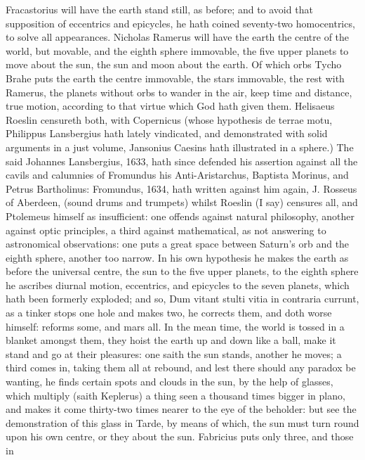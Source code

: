 {Fracastorius will have the earth stand still, as before; and to avoid
that supposition of eccentrics and epicycles, he hath coined
seventy-two homocentrics, to solve all appearances. Nicholas Ramerus
will have the earth the centre of the world, but movable, and the
eighth sphere immovable, the five upper planets to move about the sun,
the sun and moon about the earth. Of which orbs Tycho Brahe puts the
earth the centre immovable, the stars immovable, the rest with Ramerus,
the planets without orbs to wander in the air, keep time and distance,
true motion, according to that virtue which God hath given them.
Helisaeus Roeslin censureth both, with Copernicus (whose
hypothesis de terrae motu, Philippus Lansbergius hath lately
vindicated, and demonstrated with solid arguments in a just volume,
Jansonius Caesins hath illustrated in a sphere.) The said
Johannes Lansbergius, 1633, hath since defended his assertion against
all the cavils and calumnies of Fromundus his Anti-Aristarchus,
Baptista Morinus, and Petrus Bartholinus: Fromundus, 1634, hath written
against him again, J. Rosseus of Aberdeen, \etc{} (sound drums and
trumpets) whilst Roeslin (I say) censures all, and Ptolemeus himself as
insufficient: one offends against natural philosophy, another against
optic principles, a third against mathematical, as not answering to
astronomical observations: one puts a great space between Saturn's orb
and the eighth sphere, another too narrow. In his own hypothesis he
makes the earth as before the universal centre, the sun to the five
upper planets, to the eighth sphere he ascribes diurnal motion,
eccentrics, and epicycles to the seven planets, which hath been
formerly exploded; and so, Dum vitant stulti vitia in contraria
currunt, as a tinker stops one hole and makes two, he corrects
them, and doth worse himself: reforms some, and mars all. In the mean
time, the world is tossed in a blanket amongst them, they hoist the
earth up and down like a ball, make it stand and go at their pleasures:
one saith the sun stands, another he moves; a third comes in, taking
them all at rebound, and lest there should any paradox be wanting, he
finds certain spots and clouds in the sun, by the help of
glasses, which multiply (saith Keplerus) a thing seen a thousand times
bigger in plano, and makes it come thirty-two times nearer to the eye
of the beholder: but see the demonstration of this glass in
Tarde, by means of which, the sun must turn round upon his own
centre, or they about the sun. Fabricius puts only three, and those in
}

